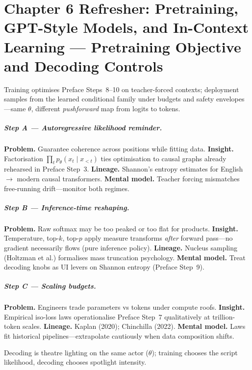 \chapter{Chapter 6 Refresher: Pretraining, GPT-Style Models, and In-Context Learning --- Pretraining Objective and Decoding Controls}
\label{chap:pretraining}

\scenelabel
Training optimises Preface Steps~8--10 on teacher-forced contexts; deployment samples from the learned conditional family under budgets and safety envelopes---same \(\theta\), different \emph{pushforward} map from logits to tokens.

\paragraph{Step A --- Autoregressive likelihood reminder.}
\textbf{Problem.} Guarantee coherence across positions while fitting data.
\textbf{Insight.} Factorisation \(\prod_t p_\theta(x_t\mid x_{<t})\) ties optimisation to causal graphs already rehearsed in Preface Step~3.
\textbf{Lineage.} Shannon's entropy estimates for English $\to$ modern causal transformers.
\textbf{Mental model.} Teacher forcing mismatches free-running drift---monitor both regimes.

\paragraph{Step B --- Inference-time reshaping.}
\textbf{Problem.} Raw softmax may be too peaked or too flat for products.
\textbf{Insight.} Temperature, top-\(k\), top-\(p\) apply measure transforms \emph{after} forward pass---no gradient necessarily flows (pure inference policy).
\textbf{Lineage.} Nucleus sampling (Holtzman et al.) formalises mass truncation psychology.
\textbf{Mental model.} Treat decoding knobs as UI levers on Shannon entropy (Preface Step~9).

\paragraph{Step C --- Scaling budgets.}
\textbf{Problem.} Engineers trade parameters vs tokens under compute roofs.
\textbf{Insight.} Empirical iso-loss laws operationalise Preface Step~7 qualitatively at trillion-token scales.
\textbf{Lineage.} Kaplan (2020); Chinchilla (2022).
\textbf{Mental model.} Laws fit historical pipelines---extrapolate cautiously when data composition shifts.

Decoding is theatre lighting on the same actor (\(\theta\)); training chooses the script likelihood, decoding chooses spotlight intensity.

